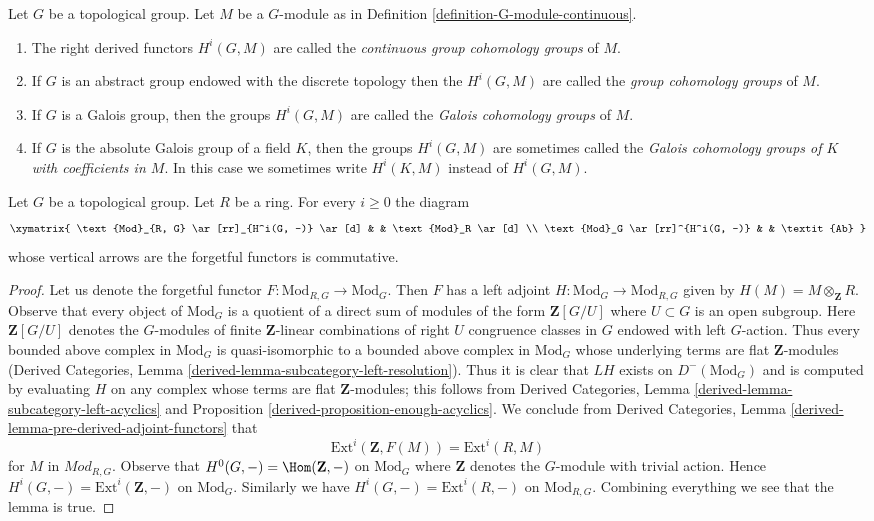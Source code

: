 \begin{definition}
\label{definition-galois-cohomology}
Let $G$ be a topological group. Let $M$ be a $G$-module as in
Definition \ref{definition-G-module-continuous}.
\begin{enumerate}
\item The right derived functors $H^i(G, M)$ are called the
{\it continuous group cohomology groups} of $M$.
\item If $G$ is an abstract group endowed with the discrete topology
then the $H^i(G, M)$ are called the {\it group cohomology groups} of $M$.
\item If $G$ is a Galois group, then the groups $H^i(G, M)$ are called
the {\it Galois cohomology groups} of $M$.
\item If $G$ is the absolute Galois group of a field $K$, then the groups
$H^i(G, M)$ are sometimes called the {\it Galois cohomology groups of $K$
with coefficients in $M$}. In this case we sometimes write
$H^i(K, M)$ instead of $H^i(G, M)$.
\end{enumerate}
\end{definition}

\begin{lemma}
\label{lemma-modules-abelian}
Let $G$ be a topological group. Let $R$ be a ring.
For every $i \geq 0$ the diagram
$$
\xymatrix{
\text{Mod}_{R, G} \ar[rr]_{H^i(G, -)} \ar[d] & &
\text{Mod}_R \ar[d] \\
\text{Mod}_G \ar[rr]^{H^i(G, -)} & &
\textit{Ab}
}
$$
whose vertical arrows are the forgetful functors is commutative.
\end{lemma}

\begin{proof}
Let us denote the forgetful functor $F : \text{Mod}_{R, G} \to \text{Mod}_G$.
Then $F$ has a left adjoint $H : \text{Mod}_G \to \text{Mod}_{R, G}$
given by $H(M) = M \otimes_\mathbf{Z} R$. Observe that every object of
$\text{Mod}_G$ is a quotient of a direct sum of modules of the form
$\mathbf{Z}[G/U]$ where $U \subset G$ is an open subgroup.
Here $\mathbf{Z}[G/U]$ denotes the $G$-modules of
finite $\mathbf{Z}$-linear combinations
of right $U$ congruence classes in $G$ endowed with left $G$-action.
Thus every bounded above complex in $\text{Mod}_G$ is quasi-isomorphic
to a bounded above complex in $\text{Mod}_G$ whose underlying
terms are flat $\mathbf{Z}$-modules
(Derived Categories, Lemma \ref{derived-lemma-subcategory-left-resolution}).
Thus it is clear that $LH$ exists on $D^-(\text{Mod}_G)$ and is computed by
evaluating $H$ on any complex whose terms are flat $\mathbf{Z}$-modules;
this follows from
Derived Categories, Lemma \ref{derived-lemma-subcategory-left-acyclics} and
Proposition \ref{derived-proposition-enough-acyclics}.
We conclude from Derived Categories, Lemma
\ref{derived-lemma-pre-derived-adjoint-functors}
that
$$
\text{Ext}^i(\mathbf{Z}, F(M)) = \text{Ext}^i(R, M)
$$
for $M$ in $\textit{Mod}_{R, G}$.
Observe that $H^0(G, -) = \Hom(\mathbf{Z}, -)$ on
$\text{Mod}_G$ where $\mathbf{Z}$ denotes the $G$-module
with trivial action. Hence
$H^i(G, -) = \text{Ext}^i(\mathbf{Z}, -)$ on $\text{Mod}_G$.
Similarly we have $H^i(G, -) = \text{Ext}^i(R, -)$ on
$\text{Mod}_{R, G}$. Combining everything we see that the lemma is true.
\end{proof}

